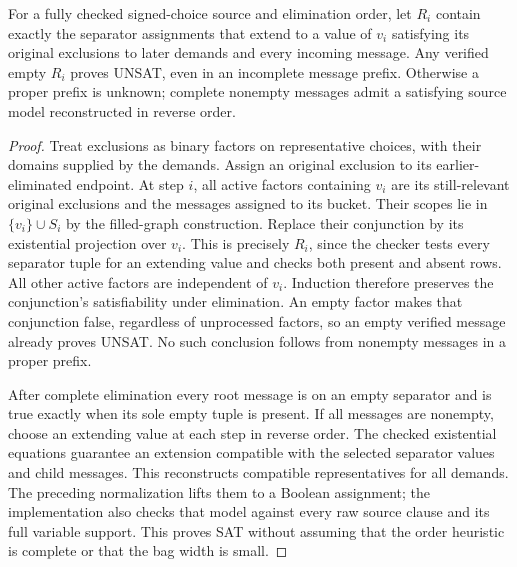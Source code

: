 \begin{samepage}
\begin{proposition}
For a fully checked signed-choice source and elimination order, let $R_i$ contain
exactly the separator assignments that extend to a value of $v_i$ satisfying its
original exclusions to later demands and every incoming message. Any verified
empty $R_i$ proves UNSAT, even in an incomplete message prefix. Otherwise a
proper prefix is unknown; complete nonempty messages admit a satisfying source
model reconstructed in reverse order.
\end{proposition}
\end{samepage}
\begin{proof}
Treat exclusions as binary factors on representative choices, with their domains
supplied by the demands. Assign an original exclusion to its earlier-eliminated
endpoint. At step $i$, all active factors containing $v_i$ are its still-relevant
original exclusions and the messages assigned to its bucket. Their scopes lie
in $\{v_i\}\cup S_i$ by the filled-graph construction. Replace their conjunction
by its existential projection over $v_i$. This is precisely $R_i$, since the
checker tests every separator tuple for an extending value and checks both
present and absent rows. All other active factors are independent of $v_i$.
Induction therefore preserves the conjunction's satisfiability under elimination.
An empty factor makes that conjunction false, regardless of unprocessed factors,
so an empty verified message already proves UNSAT. No such conclusion follows
from nonempty messages in a proper prefix.

After complete elimination every root message is on an empty separator and is
true exactly when its sole empty tuple is present. If all messages are nonempty,
choose an extending value at each step in reverse order. The checked existential
equations guarantee an extension compatible with the selected separator values
and child messages. This reconstructs compatible representatives for all demands.
The preceding normalization lifts them to a Boolean assignment; the implementation
also checks that model against every raw source clause and its full variable
support. This proves SAT without assuming that the order heuristic is complete
or that the bag width is small.
\end{proof}

